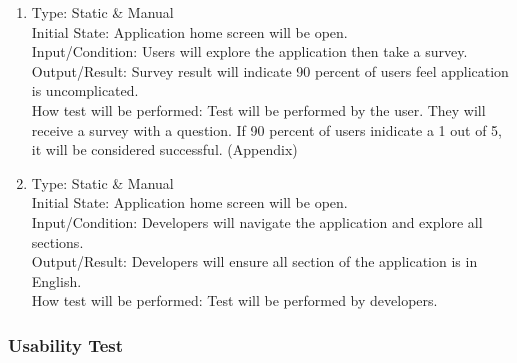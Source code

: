 \documentclass[12pt, titlepage]{article}
\begin{document}
\begin{adjustwidth}{2.2em}{0pt}
\begin{enumerate}[{NF-AT}1.]
    \item Type: Static \& Manual \\
    Initial State: Application home screen will be open.\\
    Input/Condition: Users will explore the application then take a survey.\\
    Output/Result: Survey result will indicate 90 percent of users feel application is uncomplicated. \\
    How test will be performed: Test will be performed by the user. They will receive a survey with a question. If 90 percent of users inidicate a 1 out of 5, it will be considered successful. (Appendix)
    
    \item Type: Static \& Manual\\
    Initial State: Application home screen will be open.\\
    Input/Condition: Developers will navigate the application and explore all sections.\\
    Output/Result: Developers will ensure all section of the application is in English.\\
    How test will be performed: Test will be performed by developers. 
  \end{enumerate}
\end{adjustwidth}

\subsubsection{Usability Test}
\end{document}

